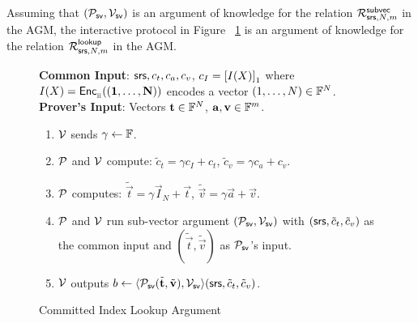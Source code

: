 \begin{lemma}\label{lem:proto-committed-index-lookup}
Assuming that $(\mathcal{P}_{\mathsf{sv}},\mathcal{V}_{\mathsf{sv}})$ is an argument of knowledge for the relation $\mathcal{R}^{\mathsf{subvec}}_{\mathsf{srs},N,m}$ in the AGM, the interactive protocol
in Figure ~\ref{fig:committed-index-lookup} is an argument of knowledge for the relation $\mathcal{R}^{\mathsf{lookup}}_{\mathsf{srs},N,m}$ in the AGM.
\end{lemma}

\begin{figure}[htbp]
\begin{mdframed}
{
    {\bf Common Input}: $\mathsf{srs},c_t, c_a, c_v$, $c_I=\left[{I(X)}\right]_1$ where $I(X)=\mathsf{Enc}_{{}_{\mathbb{H}}}(\mathbf{(1,\ldots,N)})$ encodes a vector $(1,\ldots,N)\in \mathbb{F}^N$. \\
    {\bf Prover's Input}: Vectors $\mathbf{t}\in \mathbb{F}^N$, $\mathbf{a},\mathbf{v}\in\mathbb{F}^m$.
    \begin{enumerate}[leftmargin=1em, label=\arabic*.]
    \item $\mathcal{V}$ sends $\gamma\gets \mathbb{F}$.
    \item $\mathcal{P}$ and $\mathcal{V}$ compute: $\tilde{c}_t=\gamma c_I+c_t$, $\tilde{c}_v=\gamma c_a + c_v$.
    \item $\mathcal{P}$ computes: $\tilde{\vec{t}}=\gamma\vec{I}_N + \vec{t}$, $\tilde{\vec{v}}=\gamma\vec{a} + \vec{v}$.
    \item $\mathcal{P}$ and $\mathcal{V}$ run sub-vector argument $(\mathcal{P}_{\mathsf{sv}},\mathcal{V}_{\mathsf{sv}})$ with
    $(\mathsf{srs},\tilde{c}_t,\tilde{c}_v)$ as the common input and $(\tilde{\vec{t}},\tilde{\vec{v}})$ as $\mathcal{P}_{\mathsf{sv}}$'s input.
    \item $\mathcal{V}$ outputs
    $b\gets \langle {\ensuremath{\mathcal{P}}_{\mathsf{sv}}}({\tilde{\mathbf{t}},\tilde{\mathbf{v}}}), {\mathcal{V}_{\mathsf{sv}}}\rangle({\mathsf{srs},\tilde{c}_t,\tilde{c}_v})$.
    \end{enumerate}
}
\end{mdframed}
\caption{Committed Index Lookup Argument}
\label{fig:committed-index-lookup}
\end{figure}

